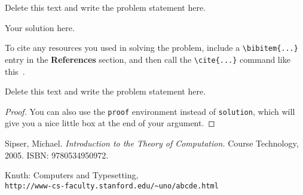 \documentclass[12pt]{article}
\newenvironment{exercise}[2][Exercise]{\begin{trivlist}
\item[\hskip \labelsep {\bfseries #1}\hskip \labelsep {\bfseries #2.}]}{\end{trivlist}}
\newenvironment{solution}[1][Solution]{\begin{trivlist}
\item[\hskip \labelsep {\bfseries #1}\hskip \labelsep {\bfseries}]}{\end{trivlist}}
\begin{document}
 

\newcommand{\studentName}{YOUR NAME HERE}

\newcommand{\assignmentnum}{X} %

\newcommand{\collaborators}{
	with \textit{COLLABORATORS' NAMES HERE}
}

\begin{exercise}{xyz}
Delete this text and write the problem statement here.
\end{exercise}
 
\begin{solution}
Your solution here. 

To cite any resources you used in solving the problem, include a \texttt{\textbackslash{}bibitem\{...\}} entry in the \textbf{References} section, and then call the \texttt{\textbackslash{}cite\{...\}} command like this~\cite{sipser}.
\end{solution}

\clearpage

\begin{exercise}{abc}
Delete this text and write the problem statement here.
\end{exercise}
 
\begin{proof}
You can also use the \texttt{proof} environment instead of \texttt{solution}, which will give you a nice little box at the end of your argument.
\end{proof}

\clearpage

\begin{thebibliography}{9}
Sipser, Michael. 
\textit{Introduction to the Theory of Computation.} 
Course Technology, 2005. ISBN: 9780534950972. 
 
Knuth: Computers and Typesetting,
\\\texttt{http://www-cs-faculty.stanford.edu/\~{}uno/abcde.html}
\end{thebibliography}

 
\end{document}
